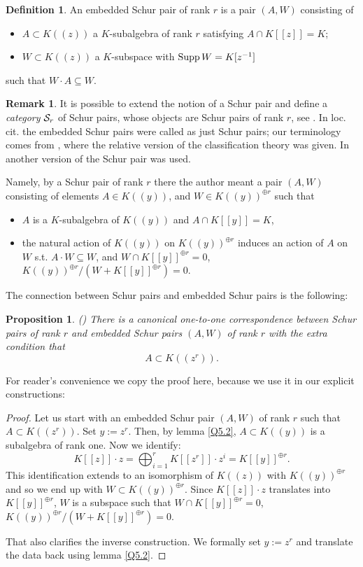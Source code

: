 \documentclass[11pt]{article}
\theoremstyle{definition}
\newcommand{\Sup}{\mathop {\rm Supp}}
\newtheorem{Def}{Definition}[section]
\newtheorem{rem}{Remark}[section]
\theoremstyle{plain}
\newtheorem{Prop}{Proposition}[section]
\numberwithin{equation}{section}
\newcommand{\cs}{{{\cal S}}}
\begin{document}
\begin{Def}
\label{D:Schur_pair}
An embedded Schur pair of rank $r$  is a pair $(A,W)$ consisting of 
\begin{itemize}
\item
$A\subset K((z))$ a $K$-subalgebra of rank $r$ satisfying $A\cap K[[z]]=K$;
\item 
$W\subset K((z))$ a $K$-subspace with $\Sup W= K[z^{-1}]$
\end{itemize}
such that $W\cdot A\subseteq W$.
\end{Def} 

\begin{rem}
\label{R:Quandt}
It is possible to extend the notion of a Schur pair and define a {\it category} $\cs_r$ of Schur pairs, whose objects are Schur pairs of rank $r$, see \cite{Mu}. In loc. cit. the embedded Schur pairs were called as just Schur pairs; our terminology comes from \cite{Q}, where the relative version of the classification theory was given. In \cite{Q} another version of the Schur pair was used.

Namely, by a Schur pair of rank $r$  there the author meant a pair $(A ,W )$ consisting of elements $A\in K((y))$, and $W\in K((y))^{\oplus r}$ such that 
\begin{itemize}
\item 
$A$ is a $K$-subalgebra of $K((y))$ and $A\cap K[[y]]=K$,
\item
the natural action of $K((y))$ on $K((y))^{\oplus r}$ induces an action of $A$ on $W$ s.t. $A\cdot W\subseteq W$, and $W\cap K[[y]]^{\oplus r}=0$, $K((y))^{\oplus r}/(W+K[[y]]^{\oplus r})=0$. 
\end{itemize}
 
\end{rem}

The connection between Schur pairs and embedded Schur pairs is the following:

\begin{Prop}{(\cite[Prop.5.4]{Q})}
\label{Q5.4}
There is a canonical one-to-one correspondence between Schur pairs of rank $r$ and embedded Schur pairs $(A,W)$ of rank $r$ with the extra condition that
$$
A\subset K((z^r)).
$$
\end{Prop}

For reader's convenience we copy the proof here, because we use it in our explicit constructions:
\begin{proof}
Let us start with an embedded Schur pair $(A,W)$ of rank $r$ such that $A\subset K((z^r))$. Set $y:=z^r$. Then, by lemma  \ref{Q5.2}, $A\subset K((y))$ is a subalgebra of rank one.  Now we identify:
$$
K[[z]]\cdot z=\bigoplus_{i=1}^r K[[z^r]]\cdot z^i= K[[y]]^{\oplus r}.
$$ 
This identification extends to an isomorphism of $K((z))$ with $K((y))^{\oplus r}$ and so we end up with $W\subset K((y))^{\oplus r}$. Since $K[[z]]\cdot z$ translates into $K[[y]]^{\oplus r}$, $W$ is a subspace  such that $W\cap K[[y]]^{\oplus r}=0$, $K((y))^{\oplus r}/(W+K[[y]]^{\oplus r})=0$.

That also clarifies the inverse construction. We formally set $y:=z^r$ and translate the data back using lemma \ref{Q5.2}. 
\end{proof}
\end{document}
